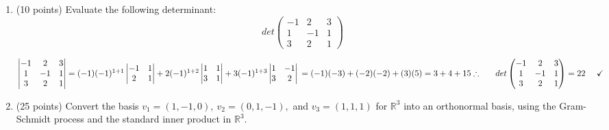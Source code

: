 \documentclass[fleqn]{article}
\begin{document}
\begin{enumerate}
    \item (10 points) Evaluate the following determinant:
    $$
      det\begin{pmatrix}
        -1 & 2 & 3
        \\
        1 & -1 & 1
        \\
        3 & 2 & 1
      \end{pmatrix}
    $$

      \textcolor{hwColor}{
        $
          \begin{vmatrix}
            -1 & 2 & 3
            \\
            1 & -1 & 1
            \\
            3 & 2 & 1
          \end{vmatrix}
          =(-1)(-1)^{1+1} \begin{vmatrix}
            -1 & 1
            \\
            2 & 1
          \end{vmatrix}
          +2(-1)^{1+2} \begin{vmatrix}
            1 & 1
            \\
            3 & 1
          \end{vmatrix}
          +3(-1)^{1+3} \begin{vmatrix}
            1 & -1
            \\
            3 & 2
          \end{vmatrix}
          \\
          \\
          \\
          =(-1)(-3)+(-2)(-2)+(3)(5)=3+4+15
          \\
          \\
          \\
          \therefore ~~~~~   det\begin{pmatrix}
            -1 & 2 & 3
            \\
            1 & -1 & 1
            \\
            3 & 2 & 1
          \end{pmatrix}=22  ~~~~ \checkmark
        $
      }

    \item (25 points) Convert the basis $v_1=(1,-1, 0), ~ v_2=(0, 1, -1),$ and $v_3=(1, 1, 1)$ for
    $\mathbb{R}^3$ into an orthonormal basis, using the Gram-Schmidt process and the standard inner product in $\mathbb{R}^3$. 



\end{enumerate}
\end{document}
